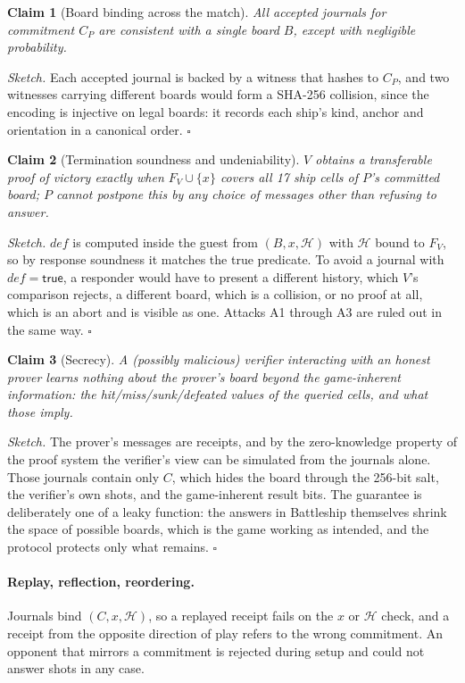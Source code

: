 \documentclass[11pt,a4paper]{article}
\newtheorem{claim}{Claim}
\newcommand{\C}{\ensuremath{C}}
\begin{document}
\begin{claim}[Board binding across the match]
All accepted journals for commitment $\C_P$ are consistent with a single
board $B$, except with negligible probability.
\end{claim}
\emph{Sketch.} Each accepted journal is backed by a witness that hashes to
$\C_P$, and two witnesses carrying different boards would form a SHA-256
collision, since the encoding is injective on legal boards: it records each
ship's kind, anchor and orientation in a canonical order. \hfill$\square$

\begin{claim}[Termination soundness and undeniability]
$V$ obtains a transferable proof of victory exactly when
$F_V \cup \{x\}$ covers all 17 ship cells of $P$'s committed board; $P$
cannot postpone this by any choice of messages other than refusing to
answer.
\end{claim}
\emph{Sketch.} $\mathit{def}$ is computed inside the guest from $(B, x,
\mathcal{H})$ with $\mathcal{H}$ bound to $F_V$, so by response soundness it
matches the true predicate. To avoid a journal with $\mathit{def} =
\textsf{true}$, a responder would have to present a different history, which
$V$'s comparison rejects, a different board, which is a collision, or no proof
at all, which is an abort and is visible as one. Attacks A1 through A3 are ruled
out in the same way. \hfill$\square$

\begin{claim}[Secrecy]
A (possibly malicious) verifier interacting with an honest prover learns
nothing about the prover's board beyond the game-inherent information: the
hit/miss/sunk/defeated values of the queried cells, and what those imply.
\end{claim}
\emph{Sketch.} The prover's messages are receipts, and by the zero-knowledge
property of the proof system the verifier's view can be simulated from the
journals alone. Those journals contain only $\C$, which hides the board through
the 256-bit salt, the verifier's own shots, and the game-inherent result bits.
The guarantee is deliberately one of a leaky function: the answers in
Battleship themselves shrink the space of possible boards, which is the game
working as intended, and the protocol protects only what remains. \hfill$\square$

\paragraph{Replay, reflection, reordering.} Journals bind $(\C, x,
\mathcal{H})$, so a replayed receipt fails on the $x$ or $\mathcal{H}$ check,
and a receipt from the opposite direction of play refers to the wrong
commitment. An opponent that mirrors a commitment is rejected during setup and
could not answer shots in any case.
\end{document}
